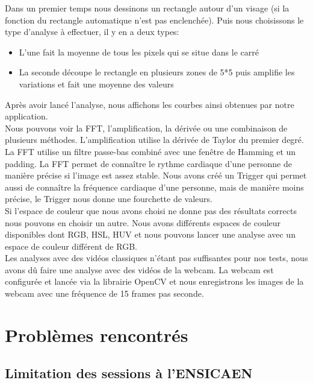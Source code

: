 Dans un premier temps nous dessinons un rectangle autour d'un visage (si la fonction du rectangle automatique n'est pas enclenchée).
Puis nous choisissons le type d'analyse à effectuer, il y en a deux types:\\
\begin{itemize}
	\item L'une fait la moyenne de tous les pixels qui se situe dans le carré
	\item La seconde découpe le rectangle en plusieurs zones de 5*5 puis amplifie les variations et fait une moyenne des valeurs
\end{itemize}
Après avoir lancé l'analyse, nous affichons les courbes ainsi obtenues par notre application.\\

Nous pouvons voir la FFT, l'amplification, la dérivée ou une combinaison de plusieurs méthodes.
L'amplification utilise la dérivée de Taylor du premier degré.
La FFT utilise un filtre passe-bas combiné avec une fenêtre de Hamming et un padding.
La FFT permet de connaître le rythme cardiaque d'une personne de manière précise si l'image est assez stable.
Nous avons créé un Trigger qui permet aussi de connaître la fréquence cardiaque d'une personne, mais de manière moins précise, le Trigger nous donne une fourchette de valeurs.\\

Si l'espace de couleur que nous avons choisi ne donne pas des résultats corrects nous pouvons en choisir un autre.
Nous avons différents espaces de couleur disponibles dont RGB, HSL, HUV et nous pouvons lancer une analyse avec un espace de couleur différent de RGB.\\

Les analyses avec des vidéos classiques n'étant pas suffisantes pour nos tests, nous avons dû faire une analyse avec des vidéos de la webcam.
La webcam est configurée et lancée via la librairie OpenCV et nous enregistrons les images de la webcam avec une fréquence de 15 frames pas seconde.\\

\section{Problèmes rencontrés}

\subsection{Limitation des sessions à l'ENSICAEN}

